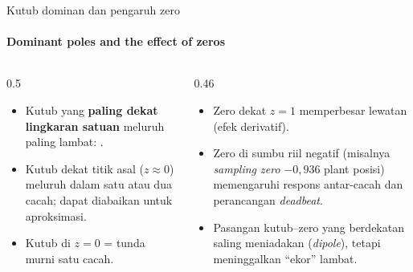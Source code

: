 \documentclass[aspectratio=169,10pt]{beamer}
\begin{document}
\begin{frame}{Kutub dominan dan pengaruh zero}
	\framesubtitle{Dominant poles and the effect of zeros}
	\begin{columns}[T]
		\begin{column}{0.5\textwidth}
			\begin{itemize}
				\item Kutub yang \textbf{paling dekat lingkaran satuan} meluruh paling lambat: .
				\item Kutub dekat titik asal ($z\approx0$) meluruh dalam satu atau dua cacah; dapat diabaikan untuk aproksimasi.
				\item Kutub di $z=0$ = tunda murni satu cacah.
			\end{itemize}
		\end{column}
		\begin{column}{0.46\textwidth}
			\begin{itemize}
				\item Zero dekat $z=1$ memperbesar lewatan (efek derivatif).
				\item Zero di sumbu riil negatif (misalnya \textit{sampling zero} $-0{,}936$ plant posisi) memengaruhi respons antar-cacah dan perancangan \textit{deadbeat}.
				\item Pasangan kutub--zero yang berdekatan saling meniadakan (\textit{dipole}), tetapi meninggalkan ``ekor'' lambat.
			\end{itemize}
		\end{column}
	\end{columns}
\end{frame}
\end{document}
